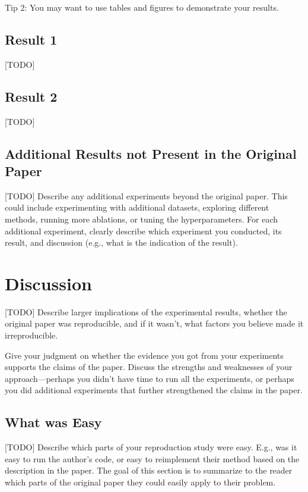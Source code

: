 \documentclass{article}
\begin{document}
Tip 2: You may want to use tables and figures to demonstrate your results.


\subsection{Result 1}
[TODO]
\subsection{Result 2}
[TODO]
\subsection{Additional Results not Present in the Original Paper}

[TODO] Describe any additional experiments beyond the original paper. This could include experimenting with additional datasets, exploring different methods, running more ablations, or tuning the hyperparameters. For each additional experiment, clearly describe which experiment you conducted, its result, and discussion (e.g., what is the indication of the result).

\section{Discussion}

[TODO] Describe larger implications of the experimental results, whether the original paper was reproducible, and if it wasn’t, what factors you believe made it irreproducible. 

Give your judgment on whether  the evidence you got from your experiments supports the claims of the paper. Discuss the strengths and weaknesses of your approach---perhaps you didn't have time to run all the experiments, or perhaps you did additional experiments that further strengthened the claims in the paper.

\subsection{What was Easy}

[TODO] Describe which parts of your reproduction study were easy. E.g., was it easy to run the author's code, or easy to reimplement their method based on the description in the paper. The goal of this section is to summarize to the reader which parts of the original paper they could easily apply to their problem. 
\end{document}
